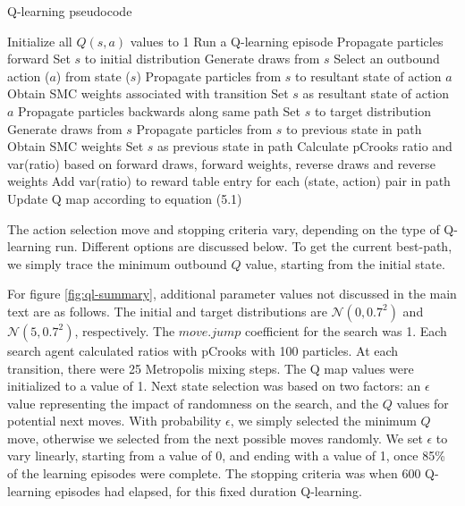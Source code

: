 \begin{algorithm}
\caption{Q-learning pseudocode}
\begin{algorithmic}[1]
    \STATE Initialize all $Q(s,a)$ values to 1
        \STATE Run a Q-learning episode
        \STATE Propagate particles forward
        \STATE Set $s$ to initial distribution
        \STATE Generate draws from $s$
            \STATE Select an outbound action ($a$) from state ($s$)
            \STATE Propagate particles from $s$ to resultant state of action $a$
            \STATE Obtain SMC weights associated with transition
            \STATE Set $s$ as resultant state of action $a$
        \ENDWHILE
        \STATE Propagate particles backwards along same path
        \STATE Set $s$ to target distribution
        \STATE Generate draws from $s$
            \STATE Propagate particles from $s$ to previous state in path
            \STATE Obtain SMC weights
            \STATE Set $s$ as previous state in path
        \ENDWHILE
        \STATE Calculate pCrooks ratio and var(ratio) based on forward draws, forward weights, reverse draws and reverse weights
        \STATE Add var(ratio) to reward table entry for each (state, action) pair in path
        \STATE Update Q map according to equation (5.1)
    \ENDWHILE
\end{algorithmic}
\end{algorithm}

The action selection move and stopping criteria vary, depending on the type of Q-learning run.
Different options are discussed below.
To get the current best-path, we simply trace the minimum outbound $Q$ value, starting from the initial state.

For figure \ref{fig:ql-summary}, additional parameter values not discussed in the main text are as follows. 
The initial and target distributions are $\mathcal{N}(0,0.7^2)$ and $\mathcal{N}(5,0.7^2)$, respectively. 
The $move.jump$ coefficient for the search was 1.
Each search agent calculated ratios with pCrooks with 100 particles.
At each transition, there were 25 Metropolis mixing steps.
The Q map values were initialized to a value of 1.
Next state selection was based on two factors: an $\epsilon$ value representing the impact of randomness on the search, and the $Q$ values for potential next moves.
With probability $\epsilon$, we simply selected the minimum $Q$ move, otherwise we selected from the next possible moves randomly.
We set $\epsilon$ to vary linearly, starting from a value of 0, and ending with a value of 1, once 85\% of the learning episodes were complete.
The stopping criteria was when 600 Q-learning episodes had elapsed, for this fixed duration Q-learning.


